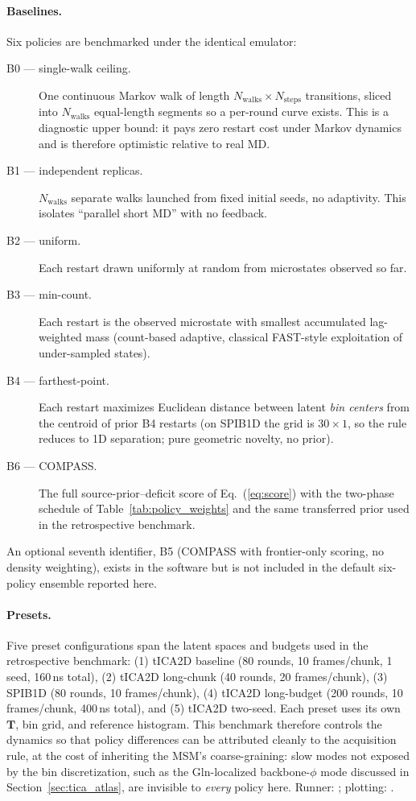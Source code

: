 \documentclass[journal=jctcce,manuscript=article,layout=twocolumn]{achemso}
\begin{document}
\paragraph{Baselines.} Six policies are benchmarked under the identical emulator:
\begin{description}
    \item[B0 --- single-walk ceiling.] One continuous Markov walk of length $N_{\mathrm{walks}}\times N_{\mathrm{steps}}$ transitions, sliced into $N_{\mathrm{walks}}$ equal-length segments so a per-round curve exists. This is a diagnostic upper bound: it pays zero restart cost under Markov dynamics and is therefore optimistic relative to real MD.
    \item[B1 --- independent replicas.] $N_{\mathrm{walks}}$ separate walks launched from fixed initial seeds, no adaptivity. This isolates ``parallel short MD'' with no feedback.
    \item[B2 --- uniform.] Each restart drawn uniformly at random from microstates observed so far.
    \item[B3 --- min-count.] Each restart is the observed microstate with smallest accumulated lag-weighted mass (count-based adaptive, classical FAST-style exploitation of under-sampled states).\cite{zimmerman2015fast}
    \item[B4 --- farthest-point.] Each restart maximizes Euclidean distance between latent \emph{bin centers} from the centroid of prior B4 restarts (on SPIB1D the grid is $30\times1$, so the rule reduces to 1D separation; pure geometric novelty, no prior).
    \item[B6 --- COMPASS.] The full source-prior--deficit score of Eq.~(\ref{eq:score}) with the two-phase schedule of Table~\ref{tab:policy_weights} and the same transferred prior used in the retrospective benchmark.
\end{description}
\noindent An optional seventh identifier, B5 (COMPASS with frontier-only scoring, no density weighting), exists in the software but is not included in the default six-policy ensemble reported here.

\paragraph{Presets.} Five preset configurations span the latent spaces and budgets used in the retrospective benchmark: (1) tICA2D baseline (80 rounds, 10 frames/chunk, 1 seed, 160\,ns total), (2) tICA2D long-chunk (40 rounds, 20 frames/chunk), (3) SPIB1D (80 rounds, 10 frames/chunk), (4) tICA2D long-budget (200 rounds, 10 frames/chunk, 400\,ns total), and (5) tICA2D two-seed. Each preset uses its own $\mathbf{T}$, bin grid, and reference histogram. This benchmark therefore controls the dynamics so that policy differences can be attributed cleanly to the acquisition rule, at the cost of inheriting the MSM's coarse-graining: slow modes not exposed by the bin discretization, such as the Gln-localized backbone-$\phi$ mode discussed in Section~\ref{sec:tica_atlas}, are invisible to \emph{every} policy here. Runner: ; plotting: .
\end{document}
